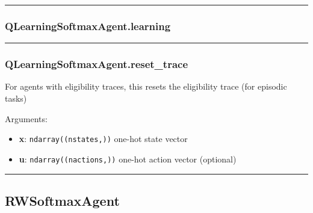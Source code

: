 \begin{center}\rule{0.5\linewidth}{\linethickness}\end{center}

\hypertarget{qlearningsoftmaxagent.learning}{%
\subsubsection{QLearningSoftmaxAgent.learning}\label{qlearningsoftmaxagent.learning}}

\begin{Shaded}
\begin{Highlighting}[]
\end{Highlighting}
\end{Shaded}

\begin{center}\rule{0.5\linewidth}{\linethickness}\end{center}

\hypertarget{qlearningsoftmaxagent.reset_trace}{%
\subsubsection{QLearningSoftmaxAgent.reset\_trace}\label{qlearningsoftmaxagent.reset_trace}}

\begin{Shaded}
\begin{Highlighting}[]
\OperatorTok{=}\NormalTok{)}
\end{Highlighting}
\end{Shaded}

For agents with eligibility traces, this resets the eligibility trace
(for episodic tasks)

Arguments:

\begin{itemize}
\tightlist
\item
  \textbf{x}: \texttt{ndarray((nstates,))} one-hot state vector
\item
  \textbf{u}: \texttt{ndarray((nactions,))} one-hot action vector
  (optional)
\end{itemize}

\begin{center}\rule{0.5\linewidth}{\linethickness}\end{center}

\hypertarget{rwsoftmaxagent}{%
\subsection{RWSoftmaxAgent}\label{rwsoftmaxagent}}

